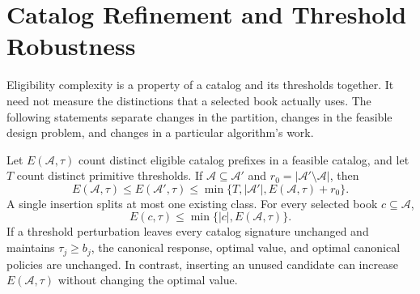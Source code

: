 \section{Catalog Refinement and Threshold Robustness}\label{sec:r51-robust}
Eligibility complexity is a property of a catalog and its thresholds together. It need not measure the distinctions that a selected book actually uses. The following statements separate changes in the partition, changes in the feasible design problem, and changes in a particular algorithm's work.

\begin{theorem}\label{thm:r51-partitions}
Let $E(\mathcal A,\tau)$ count distinct eligible catalog prefixes in a feasible catalog, and let $T$ count distinct primitive thresholds. If $\mathcal A\subseteq\mathcal A'$ and $r_0=|\mathcal A'\setminus\mathcal A|$, then
\begin{equation}\label{eq:r51-refinement}
 E(\mathcal A,\tau)\leq E(\mathcal A',\tau)
 \leq\min\{T,|\mathcal A'|,E(\mathcal A,\tau)+r_0\}.
\end{equation}
A single insertion splits at most one existing class. For every selected book $c\subseteq\mathcal A$,
\begin{equation}\label{eq:r51-endogenous}
 E(c,\tau)\leq\min\{|c|,E(\mathcal A,\tau)\}.
\end{equation}
If a threshold perturbation leaves every catalog signature unchanged and maintains $\tau_j\geq b_j$, the canonical response, optimal value, and optimal canonical policies are unchanged. In contrast, inserting an unused candidate can increase $E(\mathcal A,\tau)$ without changing the optimal value.
\end{theorem}

